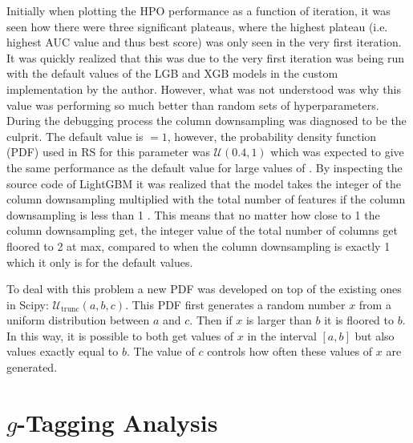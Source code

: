 Initially when plotting the HPO performance as a function of iteration, it was seen how there were three significant plateaus, where the highest plateau (i.e. highest AUC value and thus best score) was only seen in the very first iteration. It was quickly realized that this was due to the very first iteration was being run with the default values of the LGB and XGB models in the custom implementation by the author. However, what was not understood was why this value was performing so much better than random sets of hyperparameters. During the debugging process the column downsampling  was diagnosed to be the culprit. The default value is $=1$, however, the probability density function (PDF) used in RS for this parameter was $\mathcal{U}(0.4, 1)$ which was expected to give the same performance as the default value for large values of . By inspecting the source code of LightGBM it was realized that the model takes the integer of the column downsampling multiplied with the total number of features if the column downsampling is less than \num{1} \autocite{MicrosoftLightGBM}. This means that no matter how close to \num{1} the column downsampling get, the integer value of the total number of columns get floored to \num{2} at max, compared to when the column downsampling is exactly \num{1} which it only is for the default values.

To deal with this problem a new PDF was developed on top of the existing ones in Scipy: $\mathcal{U}_\mathrm{trunc}(a, b, c)$. This PDF first generates a random number $x$ from a uniform distribution between $a$ and $c$. Then if $x$ is larger than $b$ it is floored to $b$. In this way, it is possible to both get values of $x$ in the interval $[a, b]$ but also values exactly equal to $b$. The value of $c$ controls how often these  values of $x$ are generated.








\FloatBarrier
\section[g-Tagging Analysis]{$g$-Tagging Analysis}
\label{sec:q:g_tagging_analysis}


